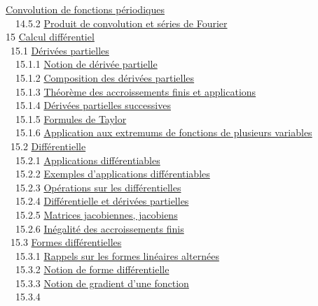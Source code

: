 \documentclass[]{article}
\begin{document}
\href{coursse81.html\#x98-44100014.5.1}{Convolution de fonctions
périodiques} \\ ~~14.5.2 \href{coursse81.html\#x98-44200014.5.2}{Produit
de convolution et séries de Fourier} \\ 15
\href{coursch16.html\#x99-44300015}{Calcul différentiel} \\ ~15.1
\href{coursse82.html\#x100-44400015.1}{Dérivées partielles} \\ ~~15.1.1
\href{coursse82.html\#x100-44500015.1.1}{Notion de dérivée partielle} \\
~~15.1.2 \href{coursse82.html\#x100-44600015.1.2}{Composition des
dérivées partielles} \\ ~~15.1.3
\href{coursse82.html\#x100-44700015.1.3}{Théorème des accroissements
finis et applications} \\ ~~15.1.4
\href{coursse82.html\#x100-44800015.1.4}{Dérivées partielles
successives} \\ ~~15.1.5
\href{coursse82.html\#x100-44900015.1.5}{Formules de Taylor} \\ ~~15.1.6
\href{coursse82.html\#x100-45000015.1.6}{Application aux extremums de
fonctions de plusieurs variables} \\ ~15.2
\href{coursse83.html\#x101-45100015.2}{Différentielle} \\ ~~15.2.1
\href{coursse83.html\#x101-45200015.2.1}{Applications différentiables}
\\ ~~15.2.2 \href{coursse83.html\#x101-45300015.2.2}{Exemples
d'applications différentiables} \\ ~~15.2.3
\href{coursse83.html\#x101-45400015.2.3}{Opérations sur les
différentielles} \\ ~~15.2.4
\href{coursse83.html\#x101-45500015.2.4}{Différentielle et dérivées
partielles} \\ ~~15.2.5
\href{coursse83.html\#x101-45600015.2.5}{Matrices jacobiennes,
jacobiens} \\ ~~15.2.6
\href{coursse83.html\#x101-45700015.2.6}{Inégalité des accroissements
finis} \\ ~15.3 \href{coursse84.html\#x102-45800015.3}{Formes
différentielles} \\ ~~15.3.1
\href{coursse84.html\#x102-45900015.3.1}{Rappels sur les formes
linéaires alternées} \\ ~~15.3.2
\href{coursse84.html\#x102-46000015.3.2}{Notion de forme différentielle}
\\ ~~15.3.3 \href{coursse84.html\#x102-46100015.3.3}{Notion de gradient
d'une fonction} \\ ~~15.3.4
\end{document}
